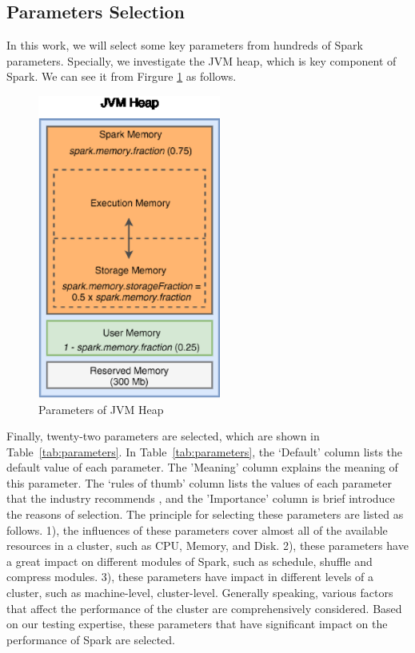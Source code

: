 \subsection{Parameters Selection}\label{subsec:parameters}
\par In this work, we will select some key parameters from hundreds of Spark parameters. Specially, we investigate the JVM heap, which is key component of Spark. We can see it from Firgure \ref{fig:ParametersJVM} as follows.
\begin{figure}
	\centering
	\includegraphics[height=10cm]{3.eps}
	\caption{Parameters of JVM Heap}\label{fig:ParametersJVM}
\end{figure}
 \par Finally, twenty-two parameters are selected, which are shown in Table~\ref{tab:parameters}.  In Table~\ref{tab:parameters}, the ‘Default’ column lists the default value of each parameter. The 'Meaning' column  explains the meaning of this parameter. The ‘rules of thumb’ column lists the values of each parameter that the industry recommends \cite{SparkConfiguration} \cite{Sparkhub}, and the 'Importance' column is brief introduce the reasons of selection.  The principle for selecting these parameters are listed as follows. 1), the influences of these parameters cover almost all of the available resources in a cluster, such as CPU, Memory, and Disk. 2), these parameters have a great impact on different modules of Spark, such as schedule, shuffle and compress modules. 3), these parameters have impact in different levels of a cluster, such as machine-level, cluster-level. Generally speaking, various factors that affect the performance of the cluster are comprehensively considered. Based on our testing expertise, these parameters that have significant impact on the performance of Spark are selected.



